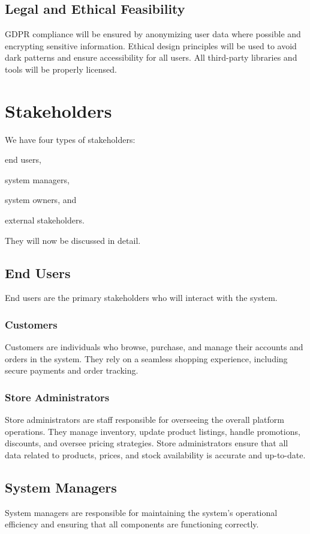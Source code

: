 \documentclass[a4paper,journal]{IEEEtran}
\begin{document}
\subsection{Legal and Ethical Feasibility}
GDPR compliance will be ensured by anonymizing user data where possible and
encrypting sensitive information.
Ethical design principles will be used to avoid dark patterns and ensure
accessibility for all users.
All third-party libraries and tools will be properly licensed.

\section{Stakeholders}
We have four types of stakeholders:
\begin{enumerate*}
  \item end users,
  \item system managers,
  \item system owners, and
  \item external stakeholders.
\end{enumerate*}
They will now be discussed in detail.

\subsection{End Users}
End users are the primary stakeholders who will interact with the system.

\subsubsection{Customers}
Customers are individuals who browse, purchase, and manage their accounts and
orders in the system. They rely on a seamless shopping experience, including
secure payments and order tracking.

\subsubsection{Store Administrators}
Store administrators are staff responsible for overseeing the overall platform
operations. They manage inventory, update product listings, handle promotions,
discounts, and oversee pricing strategies. Store administrators ensure that all
data related to products, prices, and stock availability is accurate and
up-to-date.

\subsection{System Managers}
System managers are responsible for maintaining the system's operational
efficiency and ensuring that all components are functioning correctly.
\end{document}
